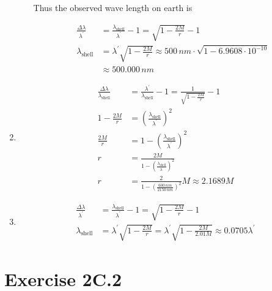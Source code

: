 \documentclass[a4paper,10pt,english]{article}
\begin{document}
\begin{enumerate}
\begin{enumerate}
Thus the observed wave length on earth is

\begin{align*}
\frac{\Delta \lambda}{\lambda^{\prime}}&=\frac{\lambda_{\text{shell}}}{\lambda^{\prime}}-1=\sqrt{1-\frac{2M}{r}}-1\\
\lambda_{\text{shell}}&=\lambda^{\prime}\sqrt{1-\frac{2M}{r}}\approx500\,nm\cdot\sqrt{1-6.9608\cdot10^{-10}}\\
&\approx500.000\,nm
\end{align*}
  
\end{enumerate}

\item 

\begin{align*}
\frac{\Delta \lambda}{\lambda_{\text{shell}}}&=\frac{\lambda^{\prime}}{\lambda_{\text{shell}}}-1=\frac{1}{\sqrt{1-\frac{2M}{r}}}-1\\
1-\frac{2M}{r}&=\left(\frac{\lambda_{\text{shell}}}{\lambda^{\prime}}\right)^{2}\\
\frac{2M}{r}&=1-\left(\frac{\lambda_{\text{shell}}}{\lambda^{\prime}}\right)^{2}\\
r&=\frac{2M}{1-\left(\frac{\lambda_{\text{shell}}}{\lambda^{\prime}}\right)^{2}}\\
r&=\frac{2}{1-\left(\frac{600\,nm}{2150\,nm}\right)^{2}}M\approx2.1689M
\end{align*}

\item 

\begin{align*}
\frac{\Delta \lambda}{\lambda^{\prime}}&=\frac{\lambda_{\text{shell}}}{\lambda^{\prime}}-1=\sqrt{1-\frac{2M}{r}}-1\\
\lambda_{\text{shell}}&=\lambda^{\prime}\sqrt{1-\frac{2M}{r}}=\lambda^{\prime}\sqrt{1-\frac{2M}{2.01M}}\approx0.0705\lambda^{\prime}
\end{align*}

\end{enumerate}
  








\section*{Exercise 2C.2}
\end{document}
